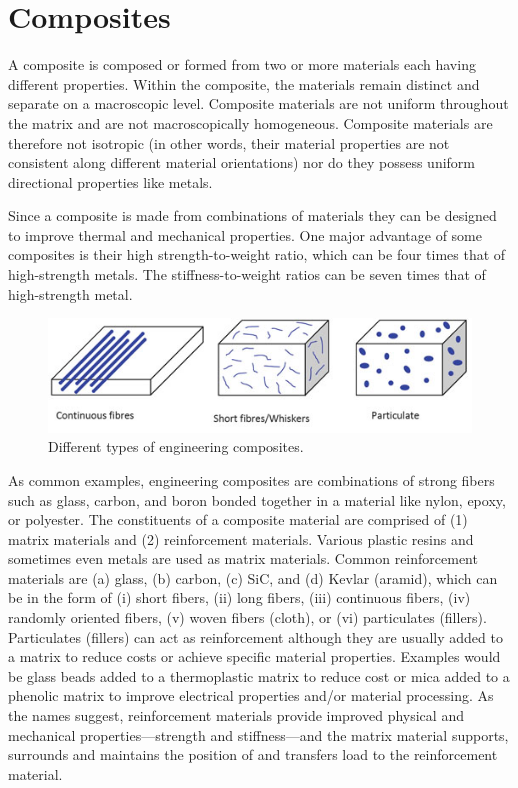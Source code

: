 \documentclass[
10pt,
a4paper,
openany,
svgnames,
]{book}
\begin{document}
\section{Composites}

A composite is composed or formed from two or more materials each having different properties. Within the composite, the materials remain distinct and separate on a macroscopic level. Composite materials are not uniform throughout the matrix and are not macroscopically homogeneous. Composite materials are therefore not isotropic (in other words, their material properties are not consistent along different material orientations) nor do they possess uniform directional properties like metals.

Since a composite is made from combinations of materials they can be designed to improve thermal and mechanical properties. One major advantage of some composites is their high strength-to-weight ratio, which can be four times that of high-strength metals. The stiffness-to-weight ratios can be seven times that of high-strength metal.

\begin{figure}[h]
  \centering
  \includegraphics[scale=0.8]{pictures/Material-selection/composite-types}
  \begin{tikzpicture}
  \end{tikzpicture}
  \caption{Different types of engineering composites.}
\end{figure}

As common examples, engineering composites are combinations of strong fibers such as glass, carbon, and boron bonded together in a material like nylon, epoxy, or polyester. The constituents of a composite material are comprised of (1) matrix materials and (2) reinforcement materials. Various plastic resins and sometimes even metals are used as matrix materials. Common reinforcement materials are (a) glass, (b) carbon, (c) SiC, and (d) Kevlar (aramid), which can be in the form of (i) short fibers, (ii) long fibers, (iii) continuous fibers, (iv) randomly oriented fibers, (v) woven fibers (cloth), or (vi) particulates (fillers). Particulates (fillers) can act as reinforcement although they are usually added to a matrix to reduce costs or achieve specific material properties. Examples would be glass beads added to a thermoplastic matrix to reduce cost or mica added to a phenolic matrix to improve electrical properties and/or material processing. As the names suggest, reinforcement materials provide improved physical and mechanical properties—strength and stiffness—and the matrix material supports, surrounds and maintains the position of and transfers load to the reinforcement material.
\end{document}
